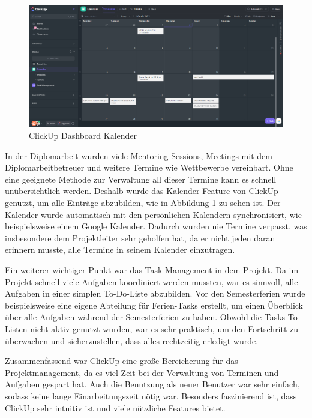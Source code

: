 \begin{figure}[h]
    \centering
    \includegraphics[width=1\textwidth]{./pics/clickup-calender-view.png}
    \caption{ClickUp Dashboard Kalender}
    \label{fig:clickup-calendar}
\end{figure}


In der Diplomarbeit wurden viele Mentoring-Sessions, Meetings mit dem Diplomarbeitbetreuer und weitere Termine wie Wettbewerbe vereinbart. Ohne eine geeignete Methode zur Verwaltung all dieser Termine kann es schnell unübersichtlich werden. Deshalb wurde das Kalender-Feature von ClickUp genutzt, um alle Einträge abzubilden, wie in Abbildung \ref{fig:clickup-calendar} zu sehen ist. Der Kalender wurde automatisch mit den persönlichen Kalendern synchronisiert, wie beispielsweise einem Google Kalender. Dadurch wurden nie Termine verpasst, was insbesondere dem Projektleiter sehr geholfen hat, da er nicht jeden daran erinnern musste, alle Termine in seinem Kalender einzutragen.

Ein weiterer wichtiger Punkt war das Task-Management in dem Projekt. Da im Projekt schnell viele Aufgaben koordiniert werden mussten, war es sinnvoll, alle Aufgaben in einer simplen To-Do-Liste abzubilden. Vor den Semesterferien wurde beispielsweise eine eigene Abteilung für Ferien-Tasks erstellt, um einen Überblick über alle Aufgaben während der Semesterferien zu haben. Obwohl die Tasks-To-Listen nicht aktiv genutzt wurden, war es sehr praktisch, um den Fortschritt zu überwachen und sicherzustellen, dass alles rechtzeitig erledigt wurde.

Zusammenfassend war ClickUp eine große Bereicherung für das
Projektmanagement, da es viel Zeit bei der Verwaltung von
Terminen und Aufgaben gespart hat. Auch die Benutzung als
neuer Benutzer war sehr einfach, sodass keine lange
Einarbeitungszeit nötig war. Besonders faszinierend ist,
dass ClickUp sehr intuitiv ist und viele nützliche Features
bietet.

